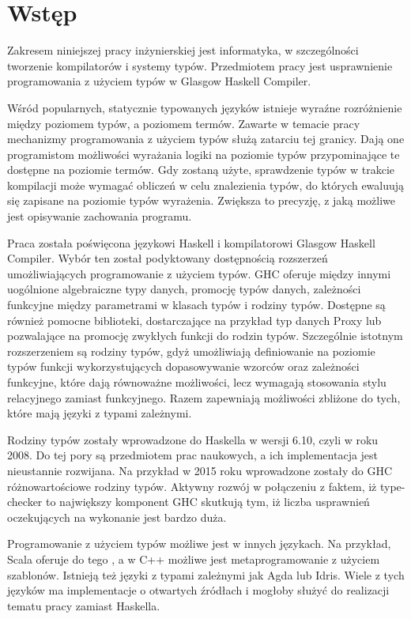 \chapter{Wstęp}\label{chap:wstep}

Zakresem niniejszej pracy inżynierskiej jest informatyka, w szczególności tworzenie kompilatorów i systemy typów. Przedmiotem pracy jest usprawnienie programowania z użyciem typów w Glasgow Haskell Compiler.

Wśród popularnych, statycznie typowanych języków istnieje wyraźne rozróżnienie między poziomem typów, a poziomem termów. Zawarte w temacie pracy mechanizmy programowania z użyciem typów służą zatarciu tej granicy. Dają one programistom możliwości wyrażania logiki na poziomie typów przypominające te dostępne na poziomie termów. Gdy zostaną użyte, sprawdzenie typów w trakcie kompilacji może wymagać obliczeń w celu znalezienia typów, do których ewaluują się zapisane na poziomie typów wyrażenia. Zwiększa to precyzję, z jaką możliwe jest opisywanie zachowania programu.

Praca została poświęcona językowi Haskell i kompilatorowi Glasgow Haskell Compiler. Wybór ten został podyktowany dostępnością rozszerzeń umożliwiających programowanie z użyciem typów. GHC oferuje między innymi uogólnione algebraiczne typy danych, promocję typów danych, zależności funkcyjne między parametrami w klasach typów i rodziny typów. Dostępne są również pomocne biblioteki, dostarczające na przykład typ danych Proxy lub pozwalające na promocję zwykłych funkcji do rodzin typów. Szczególnie istotnym rozszerzeniem są rodziny typów, gdyż umożliwiają definiowanie na poziomie typów funkcji wykorzystujących dopasowywanie wzorców oraz zależności funkcyjne, które dają równoważne możliwości, lecz wymagają stosowania stylu relacyjnego zamiast funkcyjnego. Razem zapewniają możliwości zbliżone do tych, które mają języki z typami zależnymi.

Rodziny typów zostały wprowadzone do Haskella w wersji 6.10, czyli w roku 2008. Do tej pory są przedmiotem prac naukowych, a ich implementacja jest nieustannie rozwijana. Na przykład w 2015 roku wprowadzone zostały do GHC różnowartościowe rodziny typów. Aktywny rozwój w połączeniu z faktem, iż type-checker to największy komponent GHC\cite{AOSA} skutkują tym, iż liczba usprawnień oczekujących na wykonanie jest bardzo duża.

Programowanie z użyciem typów możliwe jest w innych językach. Na przykład, Scala oferuje do tego , a w C++ możliwe jest metaprogramowanie z użyciem szablonów. Istnieją też języki z typami zależnymi jak Agda lub Idris. Wiele z tych języków ma implementacje o otwartych źródłach i mogłoby służyć do realizacji tematu pracy zamiast Haskella.

